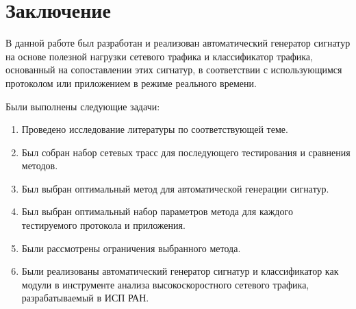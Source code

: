 \section{Заключение}
\label{sec:Chapter5} 

В данной работе был разработан и реализован автоматический генератор сигнатур на основе полезной нагрузки сетевого трафика
и классификатор трафика, основанный на сопоставлении этих сигнатур, в соответствии с использующимся протоколом или приложением в режиме реального времени.

Были выполнены следующие задачи:
\begin{enumerate}
    \item Проведено исследование литературы по соответствующей теме.
    \item Был собран набор сетевых трасс для последующего тестирования и сравнения методов.
    \item Был выбран оптимальный метод для автоматической генерации сигнатур.
    \item Был выбран оптимальный набор параметров метода для каждого тестируемого протокола и приложения.
    \item Были рассмотрены ограничения выбранного метода.
    \item Были реализованы автоматический генератор сигнатур и классификатор как модули
    в инструменте анализа высокоскоростного сетевого трафика, разрабатываемый в ИСП РАН.
\end{enumerate}

\newpage
